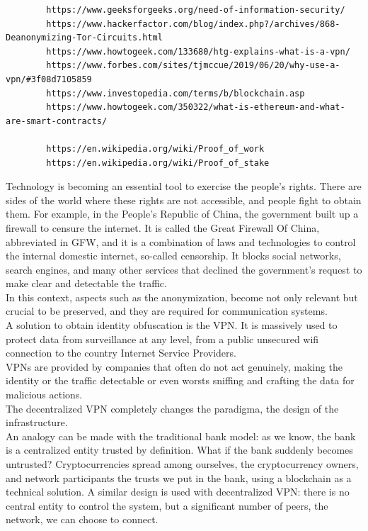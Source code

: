 \documentclass[]{article}
\begin{document}
	\begin{verbatim}
		https://www.geeksforgeeks.org/need-of-information-security/
		https://www.hackerfactor.com/blog/index.php?/archives/868-Deanonymizing-Tor-Circuits.html
		https://www.howtogeek.com/133680/htg-explains-what-is-a-vpn/
		https://www.forbes.com/sites/tjmccue/2019/06/20/why-use-a-vpn/#3f08d7105859
		https://www.investopedia.com/terms/b/blockchain.asp
		https://www.howtogeek.com/350322/what-is-ethereum-and-what-are-smart-contracts/
		
		https://en.wikipedia.org/wiki/Proof_of_work
		https://en.wikipedia.org/wiki/Proof_of_stake
	\end{verbatim}

	Technology is becoming an essential tool to exercise the people's rights. There are sides of the world where these rights are not accessible, and people fight to obtain them. For example, in the People's Republic of China, the government built up a firewall to censure the internet. It is called the Great Firewall Of China, abbreviated in GFW, and it is a combination of laws and technologies to control the internal domestic internet, so-called censorship. It blocks social networks, search engines, and many other services that declined the government's request to make clear and detectable the traffic.\\
	In this context, aspects such as the anonymization, become not only relevant but crucial to be preserved, and they are required for communication systems.\\
	A solution to obtain identity obfuscation is the VPN. It is massively used to protect data from surveillance at any level, from a public unsecured wifi connection to the country Internet Service Providers.\\VPNs are provided by companies that often do not act genuinely, making the identity or the traffic detectable or even worsts sniffing and crafting the data for malicious actions.\\

	The decentralized VPN completely changes the paradigma, the design of the infrastructure.\\
	An analogy can be made with the traditional bank model: as we know, the bank is a centralized entity trusted by definition. What if the bank suddenly becomes untrusted? Cryptocurrencies spread among ourselves, the cryptocurrency owners, and network participants the trusts we put in the bank, using a blockchain as a technical solution. 
	A similar design is used with decentralized VPN: there is no central entity to control the system, but a significant number of peers, the network, we can choose to connect.
\end{document}
